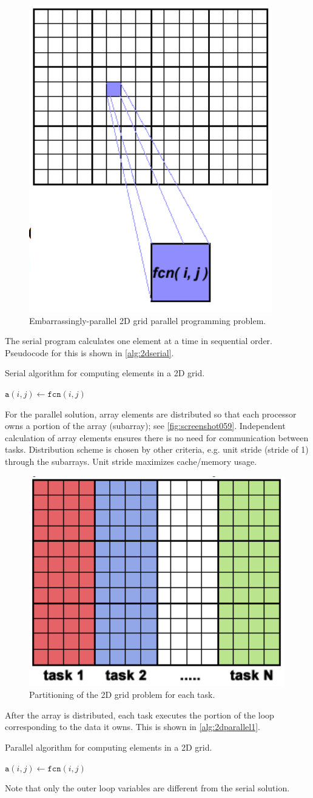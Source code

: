 \begin{figure}
\centering
\includegraphics[width=0.3\linewidth]{figures/screenshot058}
\caption{Embarrassingly-parallel 2D grid parallel programming problem.}
\label{fig:screenshot058}
\end{figure}


The serial program calculates one element at a time in sequential order. Pseudocode for this is shown in \autoref{alg:2dserial}.
\begin{algorithm}  
\caption{Serial algorithm for computing elements in a 2D grid.}
\label{alg:2dserial}
\begin{algorithmic}
		\State $\mathtt{a}(i,j) \gets \mathtt{fcn}(i,j)$
	\EndFor
\EndFor
\end{algorithmic}
\end{algorithm}

For the parallel solution, array elements are distributed so that each processor owns a portion of the array (subarray); see \autoref{fig:screenshot059}. Independent calculation of array elements ensures there is no need for communication between tasks.  Distribution scheme is chosen by other criteria, e.g. unit stride (stride of 1) through the subarrays. Unit stride maximizes cache/memory usage.
\begin{figure}
\centering
\includegraphics[width=0.4\linewidth]{figures/screenshot059}
\caption{Partitioning of the 2D grid problem for each task.}
\label{fig:screenshot059}
\end{figure}


After the array is distributed, each task executes the portion of the loop corresponding to the data it owns. This is shown in \autoref{alg:2dparallel1}.
\begin{algorithm}  
\caption{Parallel algorithm for computing elements in a 2D grid.}
\label{alg:2dparallel1}
\begin{algorithmic}
		\State $\mathtt{a}(i,j) \gets \mathtt{fcn}(i,j)$
	\EndFor
\EndFor
\end{algorithmic}
\end{algorithm}
Note that only the outer loop variables are different from the serial solution.

